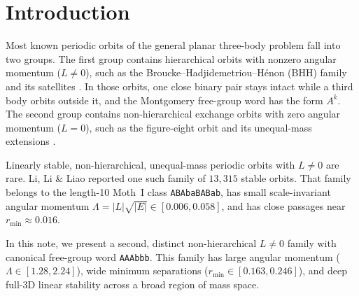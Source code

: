 \documentclass[11pt,a4paper]{article}
\begin{document}
\section{Introduction}
Most known periodic orbits of the general planar three-body problem fall into two groups.
The first group contains hierarchical orbits with nonzero angular momentum ($L \neq 0$), such as the Broucke--Hadjidemetriou--H\'enon (BHH) family and its satellites \cite{Broucke1975,BrouckeBoggs1975,Hadjidemetriou1975,Henon1976,Jankovic2016,LiLiao2020}.
In those orbits, one close binary pair stays intact while a third body orbits outside it, and the Montgomery free-group word has the form $A^k$.
The second group contains non-hierarchical exchange orbits with zero angular momentum ($L = 0$), such as the figure-eight orbit and its unequal-mass extensions \cite{Moore1993,ChencinerMontgomery2000,Suvakov2013,LiLiao2017,LiJingLiao2018}.

Linearly stable, non-hierarchical, unequal-mass periodic orbits with $L \neq 0$ are rare.
Li, Li \& Liao \cite{LiLiLiao2021} reported one such family of $13{,}315$ stable orbits.
That family belongs to the length-10 Moth~I class \texttt{ABAbaBABab}, has small scale-invariant angular momentum $\Lambda = |L|\sqrt{|E|} \in [0.006, 0.058]$, and has close passages near $r_{\min} \approx 0.016$.

In this note, we present a second, distinct non-hierarchical $L \neq 0$ family with canonical free-group word \texttt{AAAbbb}.
This family has large angular momentum ($\Lambda \in [1.28, 2.24]$), wide minimum separations ($r_{\min} \in [0.163, 0.246]$), and deep full-3D linear stability across a broad region of mass space.
\end{document}
